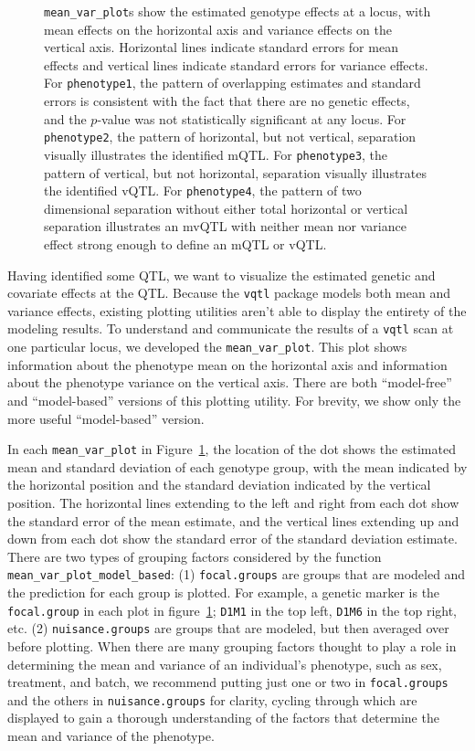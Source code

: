 \documentclass[9pt,twocolumn,twoside]{gsag3jnl}
\begin{document}
\begin{figure}[ht]
    \caption{
        \texttt{mean\_var\_plot}s show the estimated genotype effects at a locus, with mean effects on the horizontal axis and variance effects on the vertical axis.
        Horizontal lines indicate standard errors for mean effects and vertical lines indicate standard errors for variance effects.
        For \texttt{phenotype1}, the pattern of overlapping estimates and standard errors is consistent with the fact that there are no genetic effects, and the $p$-value was not statistically significant at any locus.
        For \texttt{phenotype2}, the pattern of horizontal, but not vertical, separation visually illustrates the identified mQTL.
        For \texttt{phenotype3}, the pattern of vertical, but not horizontal, separation visually illustrates the identified vQTL.
        For \texttt{phenotype4}, the pattern of two dimensional separation without either total horizontal or vertical separation illustrates an mvQTL with neither mean nor variance effect strong enough to define an mQTL or vQTL.
        \label{fig:mean_var_plots}
    }
\end{figure}

Having identified some QTL, we want to visualize the estimated genetic and covariate effects at the QTL.
Because the \texttt{vqtl} package models both mean and variance effects, existing plotting utilities aren't able to display the entirety of the modeling results.
To understand and communicate the results of a \texttt{vqtl} scan at one particular locus, we developed the \texttt{mean\_var\_plot}.
This plot shows information about the phenotype mean on the horizontal axis and information about the phenotype variance on the vertical axis.
There are both ``model-free'' and ``model-based'' versions of this plotting utility.
For brevity, we show only the more useful ``model-based'' version.

In each \texttt{mean\_var\_plot} in Figure~\ref{fig:mean_var_plots}, the location of the dot shows the estimated mean and standard deviation of each genotype group, with the mean indicated by the horizontal position and the standard deviation indicated by the vertical position.
The horizontal lines extending to the left and right from each dot show the standard error of the mean estimate, and the vertical lines extending up and down from each dot show the standard error of the standard deviation estimate.
There are two types of grouping factors considered by the function \texttt{mean\_var\_plot\_model\_based}:
(1) \texttt{focal.groups} are groups that are modeled and the prediction for each group is plotted.
For example, a genetic marker is the \texttt{focal.group} in each plot in figure~\ref{fig:mean_var_plots}; \texttt{D1M1} in the top left, \texttt{D1M6} in the top right, etc.
(2) \texttt{nuisance.groups} are groups that are modeled, but then averaged over before plotting.
When there are many grouping factors thought to play a role in determining the mean and variance of an individual's phenotype, such as sex, treatment, and batch, we recommend putting just one or two in \texttt{focal.groups} and the others in \texttt{nuisance.groups} for clarity, cycling through which are displayed to gain a thorough understanding of the factors that determine the mean and variance of the phenotype.
\end{document}
